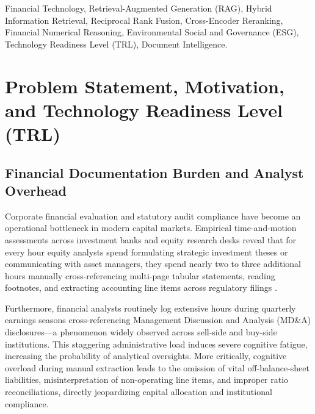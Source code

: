 \documentclass[conference]{IEEEtran}
\begin{document}
\begin{IEEEkeywords}
Financial Technology, Retrieval-Augmented Generation (RAG), Hybrid Information Retrieval, Reciprocal Rank Fusion, Cross-Encoder Reranking, Financial Numerical Reasoning, Environmental Social and Governance (ESG), Technology Readiness Level (TRL), Document Intelligence.
\end{IEEEkeywords}

\section{Problem Statement, Motivation, and Technology Readiness Level (TRL)}

\subsection{Financial Documentation Burden and Analyst Overhead}
Corporate financial evaluation and statutory audit compliance have become an operational bottleneck in modern capital markets. Empirical time-and-motion assessments across investment banks and equity research desks reveal that for every hour equity analysts spend formulating strategic investment theses or communicating with asset managers, they spend nearly two to three additional hours manually cross-referencing multi-page tabular statements, reading footnotes, and extracting accounting line items across regulatory filings \cite{wu2023bloomberggpt, yang2023fingpt}. 

Furthermore, financial analysts routinely log extensive hours during quarterly earnings seasons cross-referencing Management Discussion and Analysis (MD\&A) disclosures—a phenomenon widely observed across sell-side and buy-side institutions. This staggering administrative load induces severe cognitive fatigue, increasing the probability of analytical oversights. More critically, cognitive overload during manual extraction leads to the omission of vital off-balance-sheet liabilities, misinterpretation of non-operating line items, and improper ratio reconciliations, directly jeopardizing capital allocation and institutional compliance.
\end{document}
